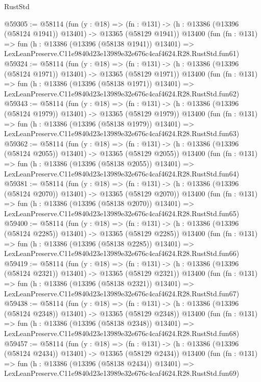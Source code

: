 \begin{lexlean}{RustStd}
\begin{coremodule}
@59305 := @58114
    (fun (y : @18) =>
    (fn : @131) -> (h : @13386 (@13396 (@58124 @1941)) @13401) -> @13365 (@58129 @1941))
    @13400
    (fun (fn : @131) =>
    fun (h : @13386 (@13396 (@58138 @1941)) @13401) =>
    LexLeanPreserve.C11e9840d23e13989e32e676c4caf4624.R28.RustStd.fun61)
@59324 := @58114
    (fun (y : @18) =>
    (fn : @131) -> (h : @13386 (@13396 (@58124 @1971)) @13401) -> @13365 (@58129 @1971))
    @13400
    (fun (fn : @131) =>
    fun (h : @13386 (@13396 (@58138 @1971)) @13401) =>
    LexLeanPreserve.C11e9840d23e13989e32e676c4caf4624.R28.RustStd.fun62)
@59343 := @58114
    (fun (y : @18) =>
    (fn : @131) -> (h : @13386 (@13396 (@58124 @1979)) @13401) -> @13365 (@58129 @1979))
    @13400
    (fun (fn : @131) =>
    fun (h : @13386 (@13396 (@58138 @1979)) @13401) =>
    LexLeanPreserve.C11e9840d23e13989e32e676c4caf4624.R28.RustStd.fun63)
@59362 := @58114
    (fun (y : @18) =>
    (fn : @131) -> (h : @13386 (@13396 (@58124 @2055)) @13401) -> @13365 (@58129 @2055))
    @13400
    (fun (fn : @131) =>
    fun (h : @13386 (@13396 (@58138 @2055)) @13401) =>
    LexLeanPreserve.C11e9840d23e13989e32e676c4caf4624.R28.RustStd.fun64)
@59381 := @58114
    (fun (y : @18) =>
    (fn : @131) -> (h : @13386 (@13396 (@58124 @2070)) @13401) -> @13365 (@58129 @2070))
    @13400
    (fun (fn : @131) =>
    fun (h : @13386 (@13396 (@58138 @2070)) @13401) =>
    LexLeanPreserve.C11e9840d23e13989e32e676c4caf4624.R28.RustStd.fun65)
@59400 := @58114
    (fun (y : @18) =>
    (fn : @131) -> (h : @13386 (@13396 (@58124 @2285)) @13401) -> @13365 (@58129 @2285))
    @13400
    (fun (fn : @131) =>
    fun (h : @13386 (@13396 (@58138 @2285)) @13401) =>
    LexLeanPreserve.C11e9840d23e13989e32e676c4caf4624.R28.RustStd.fun66)
@59419 := @58114
    (fun (y : @18) =>
    (fn : @131) -> (h : @13386 (@13396 (@58124 @2321)) @13401) -> @13365 (@58129 @2321))
    @13400
    (fun (fn : @131) =>
    fun (h : @13386 (@13396 (@58138 @2321)) @13401) =>
    LexLeanPreserve.C11e9840d23e13989e32e676c4caf4624.R28.RustStd.fun67)
@59438 := @58114
    (fun (y : @18) =>
    (fn : @131) -> (h : @13386 (@13396 (@58124 @2348)) @13401) -> @13365 (@58129 @2348))
    @13400
    (fun (fn : @131) =>
    fun (h : @13386 (@13396 (@58138 @2348)) @13401) =>
    LexLeanPreserve.C11e9840d23e13989e32e676c4caf4624.R28.RustStd.fun68)
@59457 := @58114
    (fun (y : @18) =>
    (fn : @131) -> (h : @13386 (@13396 (@58124 @2434)) @13401) -> @13365 (@58129 @2434))
    @13400
    (fun (fn : @131) =>
    fun (h : @13386 (@13396 (@58138 @2434)) @13401) =>
    LexLeanPreserve.C11e9840d23e13989e32e676c4caf4624.R28.RustStd.fun69)

\end{coremodule}
\end{lexlean}
